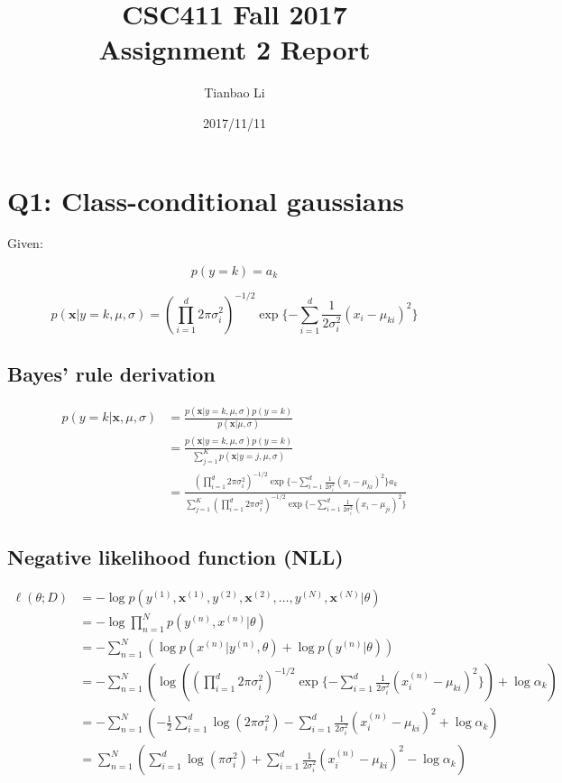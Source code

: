 \documentclass[a4paper]{article}
\title{CSC411 Fall 2017\\Assignment 2 Report}
\author{Tianbao Li}
\date{2017/11/11}
\begin{document}
\maketitle

\section{Q1: Class-conditional gaussians}

Given:

\begin{equation}
    p(y=k)=a_k
\end{equation}

\begin{equation}
    p(\mathbf{x}|y=k,\mu,\sigma)=(\prod^d_{i=1}2\pi\sigma^2_i)^{-1/2}\exp\{-\sum^d_{i=1}\frac{1}{2\sigma^2_i}(x_i-\mu_{ki})^2\}
\end{equation}

\subsection{Bayes' rule derivation}

\begin{align*}
    p(y=k|\mathbf{x},\mu,\sigma)&=\frac{p(\mathbf{x}|y=k,\mu,\sigma)p(y=k)}{p(\mathbf{x}|\mu,\sigma)}\\
    &=\frac{p(\mathbf{x}|y=k,\mu,\sigma)p(y=k)}{\sum^K_{j=1}p(\mathbf{x}|y=j,\mu,\sigma)}\\
    &=\frac{(\prod^d_{i=1}2\pi\sigma^2_i)^{-1/2}\exp\{-\sum^d_{i=1}\frac{1}{2\sigma^2_i}(x_i-\mu_{ki})^2\}a_k}{\sum^K_{j=1}(\prod^d_{i=1}2\pi\sigma^2_i)^{-1/2}\exp\{-\sum^d_{i=1}\frac{1}{2\sigma^2_i}(x_i-\mu_{ji})^2\}}
\end{align*}

\subsection{Negative likelihood function (NLL)}

\begin{align*}
    \ell(\theta;D)&=-\log p(y^{(1)},\mathbf{x}^{(1)},y^{(2)},\mathbf{x}^{(2)},\dots,y^{(N)},\mathbf{x}^{(N)}|\theta)\\
    &=-\log\prod^N_{n=1}p(y^{(n)},x^{(n)}|\theta)\\
    &=-\sum^N_{n=1}(\log p(x^{(n)}|y^{(n)},
    \theta)+\log p(y^{(n)}|\theta))\\
    &=-\sum^N_{n=1}(\log((\prod^d_{i=1}2\pi\sigma^2_i)^{-1/2}\exp\{-\sum^d_{i=1}\frac{1}{2\sigma^2_i}(x_i^{(n)}-\mu_{ki})^2\})+\log\alpha_k)\\
    &=-\sum^N_{n=1}(-\frac{1}{2}\sum^d_{i=1}\log(2\pi\sigma^2_i)-\sum^d_{i=1}\frac{1}{2\sigma^2_i}(x^{(n)}_i-\mu_{ki})^2+\log\alpha_k)\\
    &=\sum^N_{n=1}(\sum^d_{i=1}\log(\pi\sigma^2_i)+\sum^d_{i=1}\frac{1}{2\sigma^2_i}(x^{(n)}_i-\mu_{ki})^2-\log\alpha_k)
\end{align*}
\end{document}
